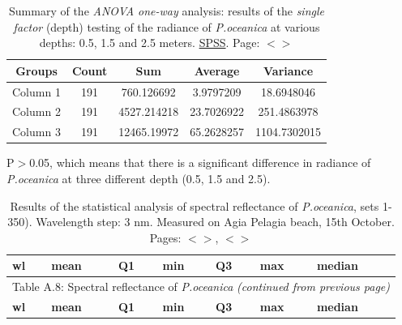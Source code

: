 \documentclass[11pt]{article}
\begin{document}
\begin{appendices}
\begin{table}[htbp]
\end{table}

\begin{table}[htbp]
	\caption{Summary of the \textit{ANOVA one-way} analysis: results of the \textit{single factor} (depth) testing of the radiance of \textit{P.oceanica} at various depths: 0.5, 1.5 and 2.5 meters. \href{http://www.spss.com/}{SPSS}. Page: $<$\pageref{page-28}$>$}\label{tab:A.7}
	\begin{center}
	\begin{tabular}{|c|c|c|c|c|}
		\hline\hline
		\textbf{Groups} & \textbf{Count} & \textbf{Sum} & \textbf{Average} & \textbf{Variance} \\ \hline\hline
		Column 1 & 191 &	760.126692 & 3.9797209 & 18.6948046 \\ \hline
		Column 2 & 191 &	4527.214218 & 23.7026922  & 251.4863978 \\ \hline
		Column 3 & 191 &	12465.19972 & 65.2628257 & 1104.7302015 \\ \hline
	\end{tabular}
	\end{center}
	P$>$0.05, which means that there is a significant difference in radiance of \textit{P.oceanica} at three different depth (0.5, 1.5 and 2.5). 
 	
\end{table}
\pagebreak

\footnotesize
\begin{longtable}{|c|c|c|c|c|c|c|}
	\caption{Results of the statistical analysis of spectral reflectance of \textit{P.oceanica}, sets 1-350). Wavelength step: 3 nm. Measured on Agia Pelagia beach, 15th October. Pages: $<$\pageref{page-28}$>$, $<$\pageref{page-40}$>$}\label{tab:A.8} \\
	  \multicolumn{1}{|l|}{\textbf{wl}} &
	   \multicolumn{1}{l|}{\textbf{mean}} & 
	   \multicolumn{1}{l|}{\textbf{Q1}} & 
	   \multicolumn{1}{l|}{\textbf{min}} & 
	   \multicolumn{1}{l|}{\textbf{Q3}} & 
	   \multicolumn{1}{l|}{\textbf{max}} & 
	   \multicolumn{1}{l|}{\textbf{median}} \\ \hline
	\endfirsthead

	\multicolumn{7}{c}{Table A.8: Spectral reflectance of \textit{P.oceanica} \textit{(continued from previous page)}}\\
	\hline \multicolumn{1}{|l|}{\textbf{wl}} & \multicolumn{1}{l|}{\textbf{mean}} & \multicolumn{1}{l|}{\textbf{Q1}} & \multicolumn{1}{l|}{\textbf{min}} & \multicolumn{1}{l|}{\textbf{Q3}} & \multicolumn{1}{l|}{\textbf{max}} & \multicolumn{1}{l|}{\textbf{median}} \\ \hline
	\endhead


\end{longtable}
\end{appendices}
\end{document}
